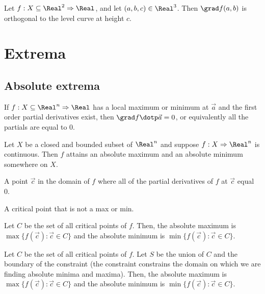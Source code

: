 \begin{theorem}
  Let $f : X \subseteq \Real^2 \Rightarrow \Real$, and let $(a, b, c) \in \Real^3$. Then $\grad f(a, b)$ is orthogonal to the level curve at height $c$.
\end{theorem}

\section{Extrema}

\subsection{Absolute extrema}


\begin{theorem}
  If $f : X \subseteq \Real^n \Rightarrow \Real$ has a local maximum or minimum at $\vec{a}$ and the first order partial derivatives exist, then $\grad f \dotp \vec{a} = 0$, or equivalently all the partials are equal to 0.
\end{theorem}

\begin{namedtheorem}
  Let $X$ be a closed and bounded subset of $\Real^n$ and suppose $f : X \Rightarrow \Real^n$ is continuous. Then $f$ attains an absolute maximum and an absolute minimum somewhere on $X$.
\end{namedtheorem}

\begin{definition}
  A point $\vec{c}$ in the domain of $f$ where all of the partial derivatives of $f$ at $\vec{c}$ equal 0.
\end{definition}

\begin{definition}
  A critical point that is not a max or min.
\end{definition}

\begin{theorem}
  Let $C$ be the set of all critical points of $f$. Then, the absolute maximum is $\max \{f(\vec{c}) : \vec{c} \in C\}$ and the absolute minimum is $\min \{f(\vec{c}) : \vec{c} \in C\}$.
\end{theorem}

\begin{theorem}
  Let $C$ be the set of all critical points of $f$. Let $S$ be the union of $C$ and the boundary of the constraint (the constraint constrains the domain on which we are finding absolute minima and maxima). Then, the absolute maximum is $\max \{f(\vec{c}) : \vec{c} \in C\}$ and the absolute minimum is $\min \{f(\vec{c}) : \vec{c} \in C\}$.
\end{theorem}

